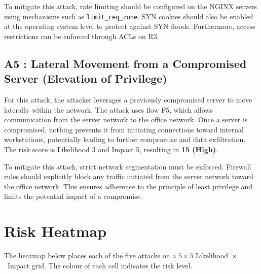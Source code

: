 \documentclass[a4paper,12pt]{article}
\begin{document}
To mitigate this attack, rate limiting should be configured on the
NGINX servers using mechanisms such as \texttt{limit\_req\_zone}.
SYN cookies should also be enabled at the operating system level to
protect against SYN floods. Furthermore, access restrictions can be
enforced through ACLs on R3.

\subsection{A5 : Lateral Movement from a Compromised Server (Elevation of Privilege)}

For this attack, the attacker leverages a previously compromised server
to move laterally within the network. The attack uses flow F5, which
allows communication from the server network to the office network.
Once a server is compromised, nothing prevents it from initiating
connections toward internal workstations, potentially leading to
further compromise and data exfiltration. The risk score is Likelihood 3
and Impact 5, resulting in \textbf{15 (High)}.

To mitigate this attack, strict network segmentation must be enforced.
Firewall rules should explicitly block any traffic initiated from the
server network toward the office network. This ensures adherence to the
principle of least privilege and limits the potential impact of a
compromise.
\section{Risk Heatmap}

The heatmap below places each of the five attacks on a
$5 \times 5$ Likelihood~$\times$~Impact grid. The colour of each
cell indicates the risk level.
\end{document}
